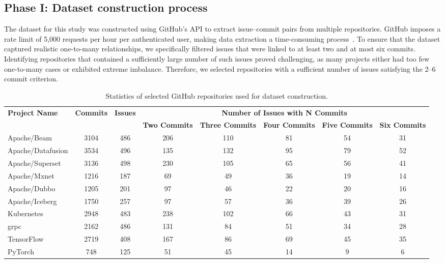 \subsection{Phase I: Dataset construction process}


The dataset for this study was constructed using GitHub’s API to extract issue--commit pairs from multiple repositories. GitHub imposes a rate limit of 5,000 requests per hour per authenticated user, making data extraction a time-consuming process~\cite{GitHubAPI}. To ensure that the dataset captured realistic one-to-many relationships, we specifically filtered issues that were linked to at least two and at most six commits. Identifying repositories that contained a sufficiently large number of such issues proved challenging, as many projects either had too few one-to-many cases or exhibited extreme imbalance. Therefore, we selected repositories with a sufficient number of issues satisfying the 2–6 commit criterion. 

\begin{table}[htbp]
\centering
\caption{Statistics of selected GitHub repositories used for dataset construction.}
\renewcommand{\arraystretch}{1.2}
\setlength{\tabcolsep}{4pt}
\label{stats}
\scriptsize
\begin{tabular}{p{2.5cm}ccccccc}
\hline
\multirow{2}{*}{\textbf{Project Name}} & 
\multirow{2}{*}{\textbf{Commits}} & 
\multirow{2}{*}{\textbf{Issues}} &
\multicolumn{5}{c}{\textbf{Number of Issues with N Commits}} \\ \cline{4-8}
 &  &  & \textbf{Two Commits} & \textbf{Three Commits} & \textbf{Four Commits} & \textbf{Five Commits} & \textbf{Six Commits} \\ \hline
Apache/Beam        & 3104 & 486 & 206 & 110 & 81 & 54 & 31 \\
Apache/Datafusion  & 3534 & 496 & 135 & 132 & 95 & 79 & 52 \\
Apache/Superset    & 3136 & 498 & 230 & 105 & 65 & 56 & 41 \\
Apache/Mxnet       & 1216 & 187 & 69 & 49 & 36 & 19 & 14 \\
Apache/Dubbo       & 1205 & 201 & 97 & 46 & 22 & 20 & 16 \\
Apache/Iceberg     & 1750 & 257 & 97 & 57 & 36 & 39 & 26 \\
Kubernetes         & 2948 & 483 & 238 & 102 & 66 & 43 & 31 \\
grpc               & 2162 & 486 & 131 & 84 & 51 & 34 & 28 \\
TensorFlow         & 2719 & 408 & 167 & 86 & 69 & 45 & 35 \\
PyTorch            & 748  & 125 & 51 & 45 & 14 & 9 & 6 \\ \hline
\end{tabular}
\end{table}


